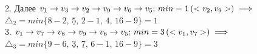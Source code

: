 \documentclass[12pt,a4paper]{article}
\begin{document}
2. Далее
\small{$
   v_1 \to v_3 \to v_2 \to v_9 \to v_6 \to v_5; \, min = 1 \, (<v_2,v_9>) \implies \\
$} $\triangle_2 = min\{8-2,\, \underline{5},\, 2-1,\, 4,\, 16-9\} = 1$ \\[10pt]
3.
\small{$
   v_1 \to v_7 \to v_8 \to v_9 \to v_6 \to v_5; \, min = 3 \, (<v_1,v_7>) \implies \\
$} $\triangle_3 = min\{9-6,\, \underline{3},\, \underline{7},\, 6-1,\, 16-9\} = 3$ \\[10pt]
\end{document}
